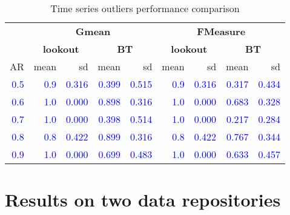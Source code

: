 \documentclass[12pt]{article}
\theoremstyle{definition}
\theoremstyle{definition}
\theoremstyle{definition}
\theoremstyle{definition}
\theoremstyle{remark}
\begin{document}
\begin{table}

\caption{\label{tab:timeseriesdatviz}Time series outliers performance comparison}
\centering
\fontsize{10}{12}\selectfont
\begin{tabular}[t]{rrrrrrrrr}
\toprule
\multicolumn{1}{c}{\textbf{}} & \multicolumn{4}{c}{\textbf{Gmean}} & \multicolumn{4}{c}{\textbf{FMeasure}} \\
\cmidrule(l{3pt}r{3pt}){2-5} \cmidrule(l{3pt}r{3pt}){6-9}
\multicolumn{1}{c}{\textbf{}} & \multicolumn{2}{c}{\textbf{lookout}} & \multicolumn{2}{c}{\textbf{BT}} & \multicolumn{2}{c}{\textbf{lookout}} & \multicolumn{2}{c}{\textbf{BT}} \\
\cmidrule(l{3pt}r{3pt}){2-3} \cmidrule(l{3pt}r{3pt}){4-5} \cmidrule(l{3pt}r{3pt}){6-7} \cmidrule(l{3pt}r{3pt}){8-9}
AR & mean & sd & mean & sd & mean & sd & mean & sd\\
\midrule
\textcolor{blue}{0.5} & \textcolor{blue}{0.9} & \textcolor{blue}{0.316} & \textcolor{blue}{0.399} & \textcolor{blue}{0.515} & \textcolor{blue}{0.9} & \textcolor{blue}{0.316} & \textcolor{blue}{0.317} & \textcolor{blue}{0.434}\\
\textcolor{blue}{0.6} & \textcolor{blue}{1.0} & \textcolor{blue}{0.000} & \textcolor{blue}{0.898} & \textcolor{blue}{0.316} & \textcolor{blue}{1.0} & \textcolor{blue}{0.000} & \textcolor{blue}{0.683} & \textcolor{blue}{0.328}\\
\textcolor{blue}{0.7} & \textcolor{blue}{1.0} & \textcolor{blue}{0.000} & \textcolor{blue}{0.398} & \textcolor{blue}{0.514} & \textcolor{blue}{1.0} & \textcolor{blue}{0.000} & \textcolor{blue}{0.217} & \textcolor{blue}{0.284}\\
\textcolor{blue}{0.8} & \textcolor{blue}{0.8} & \textcolor{blue}{0.422} & \textcolor{blue}{0.899} & \textcolor{blue}{0.316} & \textcolor{blue}{0.8} & \textcolor{blue}{0.422} & \textcolor{blue}{0.767} & \textcolor{blue}{0.344}\\
\textcolor{blue}{0.9} & \textcolor{blue}{1.0} & \textcolor{blue}{0.000} & \textcolor{blue}{0.699} & \textcolor{blue}{0.483} & \textcolor{blue}{1.0} & \textcolor{blue}{0.000} & \textcolor{blue}{0.633} & \textcolor{blue}{0.457}\\
\bottomrule
\end{tabular}
\end{table}

\hypertarget{sec:applications}{%
\section{Results on two data repositories}\label{sec:applications}}
\end{document}
